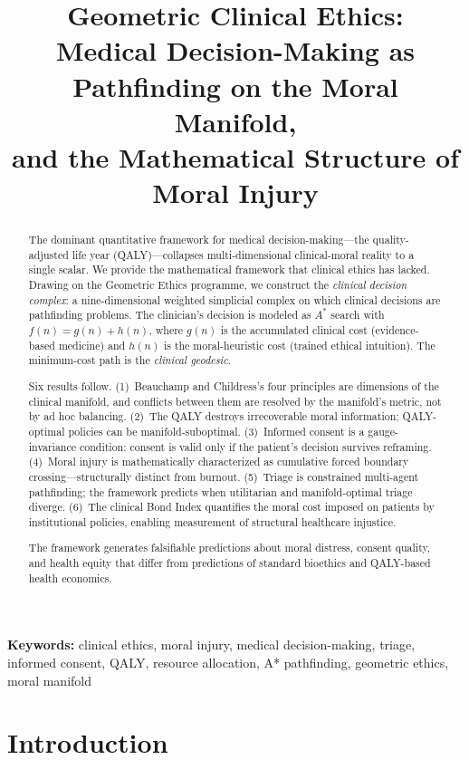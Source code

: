 \documentclass[12pt]{article}
\title{\textbf{Geometric Clinical Ethics:\\Medical Decision-Making as Pathfinding on the Moral Manifold,\\and the Mathematical Structure of Moral Injury}}
\author{}
\date{}
\theoremstyle{definition}
\theoremstyle{remark}
\begin{document}
\maketitle

\noindent\textbf{Keywords:} clinical ethics, moral injury, medical decision-making, triage, informed consent, QALY, resource allocation, A* pathfinding, geometric ethics, moral manifold

\begin{abstract}
The dominant quantitative framework for medical decision-making---the quality-adjusted life year (QALY)---collapses multi-dimensional clinical-moral reality to a single scalar.  We provide the mathematical framework that clinical ethics has lacked.  Drawing on the Geometric Ethics programme, we construct the \emph{clinical decision complex}: a nine-dimensional weighted simplicial complex on which clinical decisions are pathfinding problems.  The clinician's decision is modeled as $A^*$ search with $f(n) = g(n) + h(n)$, where $g(n)$ is the accumulated clinical cost (evidence-based medicine) and $h(n)$ is the moral-heuristic cost (trained ethical intuition).  The minimum-cost path is the \emph{clinical geodesic}.

Six results follow.  (1)~Beauchamp and Childress's four principles are dimensions of the clinical manifold, and conflicts between them are resolved by the manifold's metric, not by ad hoc balancing.  (2)~The QALY destroys irrecoverable moral information; QALY-optimal policies can be manifold-suboptimal.  (3)~Informed consent is a gauge-invariance condition: consent is valid only if the patient's decision survives reframing.  (4)~Moral injury is mathematically characterized as cumulative forced boundary crossing---structurally distinct from burnout.  (5)~Triage is constrained multi-agent pathfinding; the framework predicts when utilitarian and manifold-optimal triage diverge.  (6)~The clinical Bond Index quantifies the moral cost imposed on patients by institutional policies, enabling measurement of structural healthcare injustice.

The framework generates falsifiable predictions about moral distress, consent quality, and health equity that differ from predictions of standard bioethics and QALY-based health economics.
\end{abstract}

\section{Introduction}
\label{sec:intro}
\end{document}
